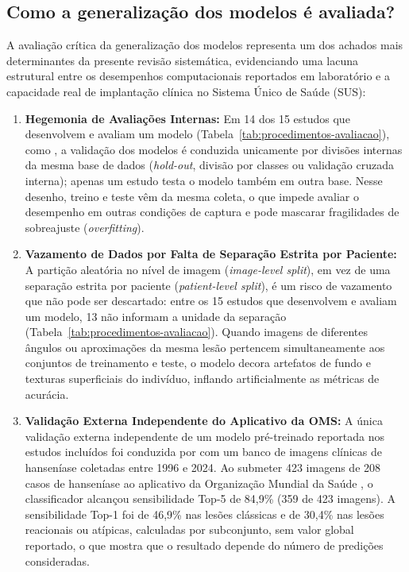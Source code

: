 \subsection{Como a generalização dos modelos é avaliada?}

A avaliação crítica da generalização dos modelos representa um dos achados mais determinantes da presente revisão sistemática, evidenciando uma lacuna estrutural entre os desempenhos computacionais reportados em laboratório e a capacidade real de implantação clínica no Sistema Único de Saúde (SUS):

\begin{enumerate}
    \item \textbf{Hegemonia de Avaliações Internas:} Em 14 dos 15 estudos que desenvolvem e avaliam um modelo (Tabela~\ref{tab:procedimentos-avaliacao}), como , a validação dos modelos é conduzida unicamente por divisões internas da mesma base de dados (\textit{hold-out}, divisão por classes ou validação cruzada interna); apenas um estudo  testa o modelo também em outra base. Nesse desenho, treino e teste vêm da mesma coleta, o que impede avaliar o desempenho em outras condições de captura e pode mascarar fragilidades de sobreajuste (\textit{overfitting}).

    \item \textbf{Vazamento de Dados por Falta de Separação Estrita por Paciente:} A partição aleatória no nível de imagem (\textit{image-level split}), em vez de uma separação estrita por paciente (\textit{patient-level split}), é um risco de vazamento que não pode ser descartado: entre os 15 estudos que desenvolvem e avaliam um modelo, 13 não informam a unidade da separação (Tabela~\ref{tab:procedimentos-avaliacao}). Quando imagens de diferentes ângulos ou aproximações da mesma lesão pertencem simultaneamente aos conjuntos de treinamento e teste, o modelo decora artefatos de fundo e texturas superficiais do indivíduo, inflando artificialmente as métricas de acurácia.

    \item \textbf{Validação Externa Independente do Aplicativo da OMS:} A única validação externa independente de um modelo pré-treinado reportada nos estudos incluídos foi conduzida por  com um banco de imagens clínicas de hanseníase coletadas entre 1996 e 2024. Ao submeter 423 imagens de 208 casos de hanseníase ao aplicativo da Organização Mundial da Saúde , o classificador alcançou sensibilidade Top-5 de 84,9\% (359 de 423 imagens). A sensibilidade Top-1 foi de 46,9\% nas lesões clássicas e de 30,4\% nas lesões reacionais ou atípicas, calculadas por subconjunto, sem valor global reportado, o que mostra que o resultado depende do número de predições consideradas.


\end{enumerate}
